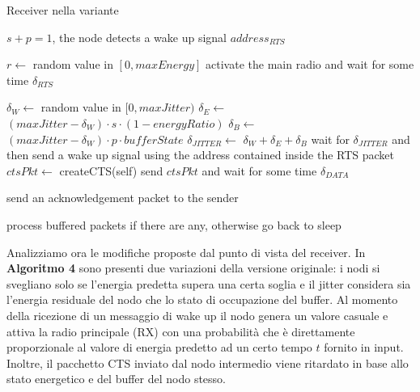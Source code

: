 \documentclass[binding=0.6cm,TFA]{sapthesis}
\begin{document}
\begin{algorithm}[H]
    \caption{Receiver nella variante}
    \begin{algorithmic}
        \REQUIRE $s+p=1$, the node detects a wake up signal $address_{RTS}$

            \STATE $r \leftarrow$ random value in $[0,maxEnergy]$
                \STATE activate the main radio and wait for some time $\delta_{RTS}$


                    \STATE $\delta_{W} \leftarrow$ random value in $[0,maxJitter)$
                    \STATE $\delta_{E} \leftarrow$ $(maxJitter-\delta_{W}) \cdot s \cdot (1 - energyRatio)$
                    \STATE $\delta_{B} \leftarrow$ $(maxJitter-\delta_{W}) \cdot p \cdot bufferState$
                    \STATE $\delta_{JITTER} \leftarrow$ $\delta_{W} + \delta_{E} + \delta_{B}$
                    \STATE wait for $\delta_{JITTER}$ and then send a wake up signal using the address contained inside the RTS packet
                    \STATE $ctsPkt \leftarrow$ createCTS(self)
                    \STATE send $ctsPkt$ and wait for some time $\delta_{DATA}$

                        \STATE send an acknowledgement packet to the sender
                    \ENDIF
                \ENDIF

                \STATE process buffered packets if there are any, otherwise go back to sleep
            \ENDIF
        
    \end{algorithmic}
\end{algorithm}

Analizziamo ora le modifiche proposte dal punto di vista del receiver. In \textbf{Algoritmo 4} sono presenti due variazioni della versione
originale: i nodi si svegliano solo se l'energia predetta supera una certa soglia e il jitter considera sia l'energia residuale del nodo che lo stato
di occupazione del buffer. Al momento della ricezione di un messaggio di wake up il nodo genera un valore casuale e attiva la radio principale (RX)
con una probabilità che è direttamente proporzionale al valore di energia predetto ad un certo tempo $t$ fornito in input. Inoltre, il pacchetto CTS
inviato dal nodo intermedio viene ritardato in base allo stato energetico e del buffer del nodo stesso.
\end{document}
